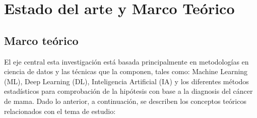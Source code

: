 \newpage
\chapter{Estado del arte y Marco Teórico}

\section{Marco teórico}

El eje central esta investigación está basada principalmente en metodologías en ciencia de datos y las técnicas que la componen, tales como:  Machine Learning (ML), Deep Learning (DL), Inteligencia Artificial (IA) y los diferentes métodos estadísticos para comprobación de la hipótesis con base a la diagnosis del cáncer de mama. Dado lo anterior, a continuación, se describen los conceptos teóricos relacionados con el tema de estudio:   

